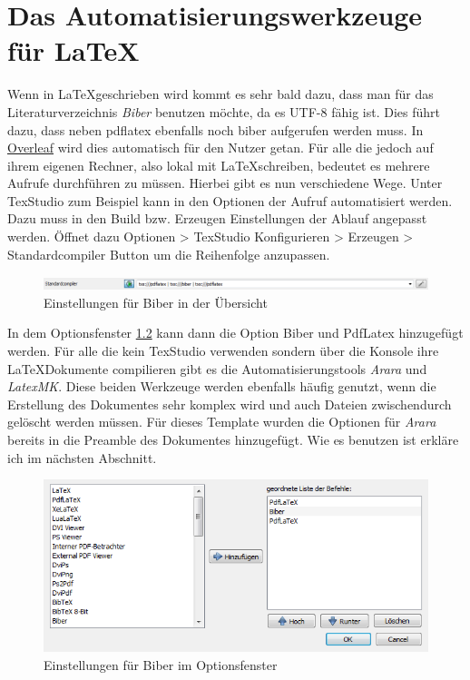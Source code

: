 \chapter{Das Automatisierungswerkzeuge für \LaTeX}
\label{automate}
Wenn in \LaTeX geschrieben wird kommt es sehr bald dazu, dass man für das Literaturverzeichnis \emph{Biber} benutzen möchte, da es UTF-8 fähig ist. Dies führt dazu, dass neben pdflatex ebenfalls noch biber aufgerufen werden muss. In \href{www.overleaf.com}{Overleaf} wird dies automatisch für den Nutzer getan. Für alle die jedoch auf ihrem eigenen Rechner, also lokal mit \LaTeX schreiben, bedeutet es mehrere Aufrufe durchführen zu müssen. Hierbei gibt es nun verschiedene Wege. Unter TexStudio zum Beispiel kann in den Optionen der Aufruf automatisiert werden. Dazu muss in den Build bzw. Erzeugen Einstellungen der Ablauf angepasst werden. Öffnet dazu Optionen > TexStudio Konfigurieren > Erzeugen > Standardcompiler Button um die Reihenfolge anzupassen. 
\begin{figure}[ht]
	\centering
	\includegraphics[width=\textwidth]{images/texstudio_option_build.PNG}
	\caption{Einstellungen für Biber in der Übersicht}
	\label{figbuild}
\end{figure}

In dem Optionsfenster \ref{figbuildOptions} kann dann die Option Biber und PdfLatex hinzugefügt werden. Für alle die kein TexStudio verwenden sondern über die Konsole ihre \LaTeX Dokumente compilieren gibt es die Automatisierungstools \emph{Arara} und \emph{LatexMK}. Diese beiden Werkzeuge werden ebenfalls häufig genutzt, wenn die Erstellung des Dokumentes sehr komplex wird und auch Dateien zwischendurch gelöscht werden müssen. Für dieses Template wurden die Optionen für \emph{Arara} bereits in die Preamble des Dokumentes hinzugefügt. Wie es benutzen ist erkläre ich im nächsten Abschnitt.

\begin{figure}[ht]
	\centering
	\includegraphics[width=\textwidth]{images/texstudio_optionwindow_build.PNG}
	\caption{Einstellungen für Biber im Optionsfenster}
	\label{figbuildOptions}
\end{figure}


